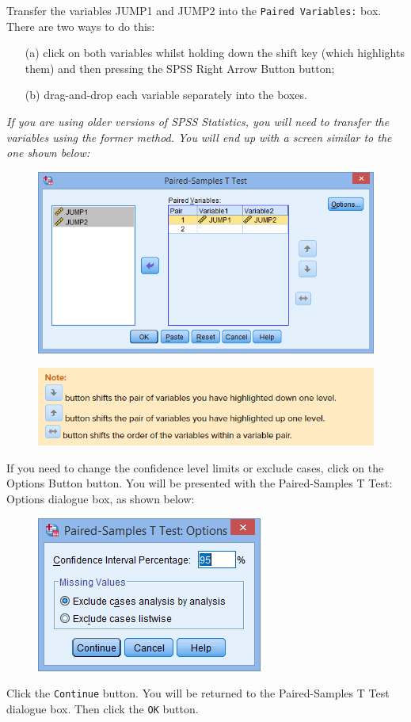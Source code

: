 \documentclass[]{article}
\begin{document}
\noindent Transfer the variables JUMP1 and JUMP2 into the \texttt{Paired Variables:} box. There are two ways to do this:
\begin{itemize}
	\item[(a)] click on both variables whilst holding down the shift key (which highlights them) and then pressing the SPSS Right Arrow Button button; 
	\item[(b)] drag-and-drop each variable separately into the boxes. 
\end{itemize}	
 
\begin{framed}	
\noindent \textit{If you are using older versions of SPSS Statistics, you will need to transfer the variables using the former method. You will end up with a screen similar to the one shown below:}
\end{framed}	
\begin{figure}[h!]
	\centering
	\includegraphics[width=0.5\linewidth]{Paired/pairedMenu3}

	\label{fig:pairedMenu3}
\end{figure}

\begin{figure}
\centering
\includegraphics[width=0.6\linewidth]{Paired/Buttons}

\label{fig:Buttons}
\end{figure}

	
	If you need to change the confidence level limits or exclude cases, click on the Options Button button. You will be presented with the Paired-Samples T Test: Options dialogue box, as shown below:
	
\begin{figure}[h!]
	\centering
	\includegraphics[width=0.5\linewidth]{Paired/pairedMenu4}

	\label{fig:pairedMenu4}
\end{figure}
	Click the \texttt{Continue} button. You will be returned to the Paired-Samples T Test dialogue box. Then click the \texttt{OK} button.
	
\end{document}
